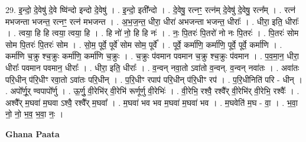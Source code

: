 \documentclass[17pt]{extarticle}
\begin{document}
29. इ॒न्दो॒ दे॒वेषु॑ दे॒वे ष्वि॑न्दो इन्दो दे॒वेषु॑ । . इ॒न्दो॒ इती᳚न्दो । . दे॒वेषु॒ रत्नꣳ॒॒ रत्न॑म् दे॒वेषु॑ दे॒वेषु॒ रत्न᳚म् । . रत्न॑ मभजन्ता भजन्त॒ रत्नꣳ॒॒ रत्न॑ मभजन्त । . अ॒भ॒ज॒न्त॒ धीरा॒ धीरा॑ अभजन्ता भजन्त॒ धीराः᳚ । . धीरा॒ इति॒ धीराः᳚ । . त्वया॒ हि हि त्वया॒ त्वया॒ हि । . हि नो॑ नो॒ हि हि नः॑ । . नः॒ पि॒तरः॑ पि॒तरो॑ नो नः पि॒तरः॑ । . पि॒तरः॑ सोम सोम पि॒तरः॑ पि॒तरः॑ सोम । . सो॒म॒ पूर्वे॒ पूर्वे॑ सोम सोम॒ पूर्वे᳚ । . पूर्वे॒ कर्मा॑णि॒ कर्मा॑णि॒ पूर्वे॒ पूर्वे॒ कर्मा॑णि । . कर्मा॑णि च॒क्रु श्च॒क्रुः कर्मा॑णि॒ कर्मा॑णि च॒क्रुः । . च॒क्रुः प॑वमान पवमान च॒क्रु श्च॒क्रुः प॑वमान । . प॒व॒मा॒न॒ धीरा॒ धीराः᳚ पवमान पवमान॒ धीराः᳚ । . धीरा॒ इति॒ धीराः᳚ । . व॒न्वन् नवा॒तो ऽवा॑तो व॒न्वन्. व॒न्वन् नवा॑तः । . अवा॑तः परि॒धीन् प॑रि॒धीꣳ रवा॒तो ऽवा॑तः परि॒धीन् । . प॒रि॒धीꣳ रपाप॑ परि॒धीन् प॑रि॒धीꣳ रप॑ । . प॒रि॒धीनिति॑ परि - धीन् । . अपो᳚र्णू॒र् ण्वपापो᳚र्णु । . ऊ॒र्णु॒ वी॒रेभि॑र् वी॒रेभि॑ रूर्णूर्णु वी॒रेभिः॑ । . वी॒रेभि॒ रश्वै॒ रश्वै᳚र् वी॒रेभि॑र् वी॒रेभि॒ रश्वैः᳚ । . अश्वै᳚र् म॒घवा॑ म॒घवा ऽश्वै॒ रश्वै᳚र् म॒घवा᳚ । . म॒घवा॑ भव भव म॒घवा॑ म॒घवा॑ भव । . म॒घवेति॑ म॒घ - वा॒ । . भ॒वा॒ नो॒ नो॒ भ॒व॒ भ॒वा॒ नः॒ । \newline

\textbf{Ghana Paata } \newline
\end{document}
